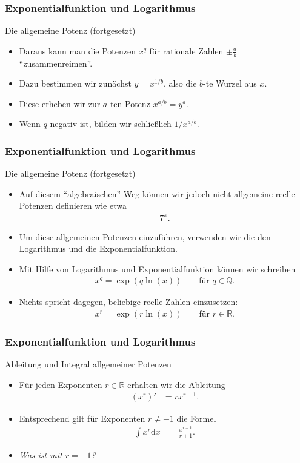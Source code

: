 \documentclass{beamer}
\newcommand\dd{\mathrm d}
\newcommand\QQ{\mathbb Q}
\newcommand\RR{\mathbb R}
\renewcommand{\ae}{\"a}
\renewcommand{\oe}{\"o}
\newcommand{\ue}{\"u}
\newcommand{\mytitle}{Exponentialfunktion und Logarithmus}
\begin{document}
\begin{frame}\frametitle{\mytitle}
	\begin{block}{Die allgemeine Potenz (fortgesetzt)}
	\begin{itemize}
		\item Daraus kann man die Potenzen $x^q$ f\ue r rationale Zahlen $\pm\frac{a}{b}$ ``zusammenreimen''.
		\item Dazu bestimmen wir zun\ae chst $y=x^{1/b}$, also die $b$-te Wurzel aus $x$.
		\item Diese erheben wir zur $a$-ten Potenz $x^{a/b}=y^a$.
		\item Wenn $q$ negativ ist, bilden wir schlie\ss lich $1/x^{a/b}$.
	\end{itemize}
	\end{block}
\end{frame}

\begin{frame}\frametitle{\mytitle}
	\begin{block}{Die allgemeine Potenz (fortgesetzt)}
	\begin{itemize}
		\item Auf diesem ``algebraischen'' Weg k\oe nnen wir jedoch nicht allgemeine reelle Potenzen definieren wie etwa
			\begin{align*}
				7^{\pi}.
			\end{align*}
		\item Um diese allgemeinen Potenzen einzuf\ue hren, verwenden wir die den Logarithmus und die Exponentialfunktion.
		\item Mit Hilfe von Logarithmus und Exponentialfunktion k\oe nnen wir schreiben
			\begin{align*}
				x^q=\exp(q\ln(x))\qquad\mbox{f\ue r }q\in\QQ.
			\end{align*}
		\item Nichts spricht dagegen, beliebige reelle Zahlen einzusetzen:
\begin{align*}
				x^r=\exp(r\ln(x))\qquad\mbox{f\ue r }r\in\RR.
			\end{align*}
	\end{itemize}
	\end{block}
\end{frame}

\begin{frame}\frametitle{\mytitle}
	\begin{block}{Ableitung und Integral allgemeiner Potenzen}
	\begin{itemize}
		\item F\ue r jeden Exponenten $r\in\RR$ erhalten wir die Ableitung
			\begin{align*}
				(x^r)'&=rx^{r-1}.
			\end{align*}
		\item Entsprechend gilt f\ue r Exponenten $r\neq-1$ die Formel
			\begin{align*}
				\int x^r\dd x&=\frac{x^{r+1}}{r+1}.
			\end{align*}
		\item \itshape Was ist mit $r=-1$?
	\end{itemize}
	\end{block}
\end{frame}
\end{document}
